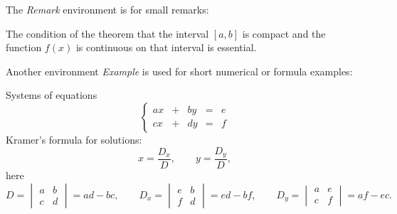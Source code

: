\documentclass[]{VUMIFTemplateClass}
\begin{document}
\noindent The \emph{Remark} environment is for small remarks:

\begin{remark}
The condition of the theorem that the interval $[a, b]$ is compact and the function $f(x)$ is continuous on that interval is essential.
\end{remark}

\noindent Another environment \emph{Example} is used for short numerical or formula examples:

\begin{example}
Systems of equations
\[
\left\{
\begin{array}{rclcl}
    ax & + & by & = & e\\
    cx & + & dy & = & f
\end{array}
\right.
\]
Kramer's formula for solutions:
\[
x = \frac{D_{x}}{D}, \qquad y = \frac{D_{y}}{D},\]
here
\[
D=
\begin{vmatrix}
a & b\\
c & d    
\end{vmatrix}=ad-bc, \qquad
D_x=
\begin{vmatrix}
e & b\\
f & d    
\end{vmatrix}=ed-bf, \qquad
D_y=
\begin{vmatrix}
a & e\\
c & f    
\end{vmatrix}=af-ec.
\]
\end{example}
\end{document}
